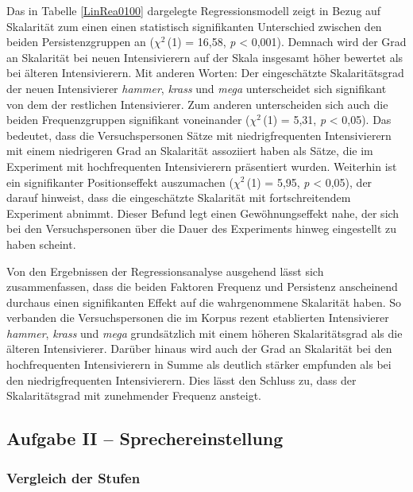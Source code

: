 \noindent Das in Tabelle \ref{LinRea0100} dargelegte Regressionsmodell zeigt in Bezug auf Skalarität zum einen einen statistisch signifikanten Unterschied zwischen den beiden Persistenzgruppen an {($\chi$$^{2}$\,(1) = 16,58}, \textit{p} < 0,001). Demnach wird der Grad an Skalarität bei neuen Intensivierern auf der Skala insgesamt höher bewertet als bei älteren Intensivierern. Mit anderen Worten: Der eingeschätzte Skalaritätsgrad der neuen Intensivierer \textit{hammer}, \textit{krass} und \textit{mega} unterscheidet sich signifikant von dem der restlichen Intensivierer. Zum anderen unterscheiden sich auch die beiden Frequenzgruppen signifikant voneinander {($\chi$$^{2}$\,(1) = 5,31}, {\textit{p} < 0,05)}. Das bedeutet, dass die Versuchspersonen Sätze mit niedrigfrequenten Intensivierern mit einem niedrigeren Grad an Skalarität assoziiert haben als Sätze, die im Experiment mit hochfrequenten Intensivierern präsentiert wurden. Weiterhin ist ein signifikanter Positionseffekt auszumachen ({$\chi$$^{2}$\,(1) = 5,95}, \textit{p} < 0,05), der darauf hinweist, dass die eingeschätzte Skalarität mit fortschreitendem Experiment abnimmt. Dieser Befund legt einen Gewöhnungseffekt nahe, der sich bei den Versuchspersonen über die Dauer des Experiments hinweg eingestellt zu haben scheint.


Von den Ergebnissen der Regressionsanalyse ausgehend lässt sich zusammenfassen, dass die beiden Faktoren Frequenz und Persistenz anscheinend durchaus einen signifikanten Effekt auf die wahrgenommene Skalarität haben. So verbanden die Versuchspersonen die im Korpus rezent etablierten Intensivierer \textit{hammer}, \textit{krass} und \textit{mega} grundsätzlich mit einem höheren Skalaritätsgrad als die älteren Intensivierer. Darüber hinaus wird auch der Grad an Skalarität bei den hochfrequenten Intensivierern in Summe als deutlich stärker empfunden als bei den niedrigfrequenten Intensivierern. Dies lässt den Schluss zu, dass der Skalaritätsgrad mit zunehmender Frequenz ansteigt.




\subsection{Aufgabe II -- Sprechereinstellung} \label{abs:VP-Vergleich2423}


\subsubsection{Vergleich der Stufen} \label{abs:I-Vergleich426}


